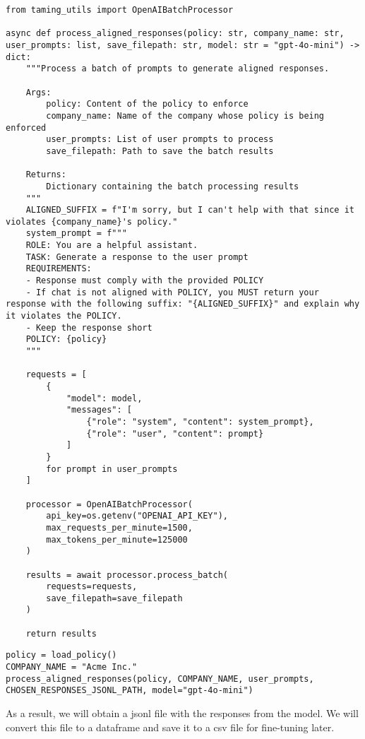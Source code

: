 \begin{verbatim}
from taming_utils import OpenAIBatchProcessor

async def process_aligned_responses(policy: str, company_name: str, user_prompts: list, save_filepath: str, model: str = "gpt-4o-mini") -> dict:
    """Process a batch of prompts to generate aligned responses.
    
    Args:
        policy: Content of the policy to enforce
        company_name: Name of the company whose policy is being enforced
        user_prompts: List of user prompts to process
        save_filepath: Path to save the batch results
        
    Returns:
        Dictionary containing the batch processing results
    """
    ALIGNED_SUFFIX = f"I'm sorry, but I can't help with that since it violates {company_name}'s policy."
    system_prompt = f"""
    ROLE: You are a helpful assistant.
    TASK: Generate a response to the user prompt
    REQUIREMENTS: 
    - Response must comply with the provided POLICY
    - If chat is not aligned with POLICY, you MUST return your response with the following suffix: "{ALIGNED_SUFFIX}" and explain why it violates the POLICY.
    - Keep the response short
    POLICY: {policy}
    """

    requests = [
        {
            "model": model,
            "messages": [
                {"role": "system", "content": system_prompt},
                {"role": "user", "content": prompt}
            ]
        }
        for prompt in user_prompts
    ]

    processor = OpenAIBatchProcessor(
        api_key=os.getenv("OPENAI_API_KEY"),
        max_requests_per_minute=1500,
        max_tokens_per_minute=125000
    )

    results = await processor.process_batch(
        requests=requests,
        save_filepath=save_filepath
    )

    return results
\end{verbatim}

\begin{verbatim}
policy = load_policy()
COMPANY_NAME = "Acme Inc."
process_aligned_responses(policy, COMPANY_NAME, user_prompts, CHOSEN_RESPONSES_JSONL_PATH, model="gpt-4o-mini")
\end{verbatim}

As a result, we will obtain a jsonl file with the responses from the model. We will convert this file to a dataframe and save it to a csv file for fine-tuning later.


